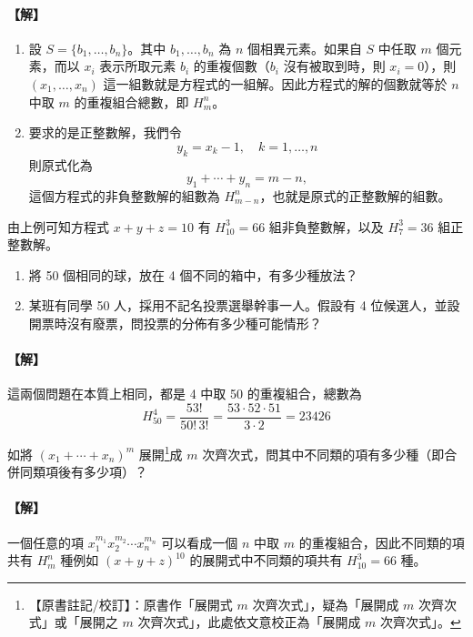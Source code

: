 \paragraph{【解】}
\begin{enumerate}[label=(\roman*), topsep=2pt, itemsep=4pt]
  \item 設 $S = \{b_1, \ldots, b_n\}$。其中 $b_1, \ldots, b_n$ 為 $n$ 個相異元素。如果自 $S$ 中任取 $m$ 個元素，而以 $x_i$ 表示所取元素 $b_i$ 的重複個數（$b_i$ 沒有被取到時，則 $x_i = 0$），則 $(x_1, \ldots, x_n)$ 這一組數就是方程式的一組解。因此方程式的解的個數就等於 $n$ 中取 $m$ 的重複組合總數，即 $H_m^n$。
  \item 要求的是正整數解，我們令
  \[
  y_k = x_k - 1, \quad k = 1, \ldots, n
  \]
  則原式化為
  \[
  y_1 + \cdots + y_n = m - n,
  \]
  這個方程式的非負整數解的組數為 $H_{m-n}^n$，也就是原式的正整數解的組數。
\end{enumerate}
由上例可知方程式 $x + y + z = 10$ 有 $H_{10}^3 = 66$ 組非負整數解，以及 $H_7^3 = 36$ 組正整數解。

\medskip
\begin{example}\label{ex:b5-2-18}
\begin{enumerate}[label=(\roman*), topsep=2pt, itemsep=4pt]
  \item 將 50 個相同的球，放在 4 個不同的箱中，有多少種放法？
  \item 某班有同學 50 人，採用不記名投票選舉幹事一人。假設有 4 位候選人，並設開票時沒有廢票，問投票的分佈有多少種可能情形？
\end{enumerate}
\end{example}
\paragraph{【解】}
這兩個問題在本質上相同，都是 4 中取 50 的重複組合，總數為
\[
H_{50}^4 = \frac{53!}{50!\, 3!} = \frac{53 \cdot 52 \cdot 51}{3 \cdot 2} = 23426 \tag*{\#}
\]

\medskip
\begin{discussion}\label{disc:b5-2-10}
如將 $(x_1 + \cdots + x_n)^m$ 展開\label{note:b5-ch2-p83-zhankai}\footnote{【原書註記/校訂】：原書作「展開式 $m$ 次齊次式」，疑為「展開成 $m$ 次齊次式」或「展開之 $m$ 次齊次式」，此處依文意校正為「展開成 $m$ 次齊次式」。}成 $m$ 次齊次式，問其中不同類的項有多少種（即合併同類項後有多少項）？
\end{discussion}
\paragraph{【解】}
一個任意的項 $x_1^{m_1} x_2^{m_2} \cdots x_n^{m_n}$ 可以看成一個 $n$ 中取 $m$ 的重複組合，因此不同類的項共有 $H_m^n$ 種例如 $(x + y + z)^{10}$ 的展開式中不同類的項共有 $H_{10}^3 = 66$ 種。

